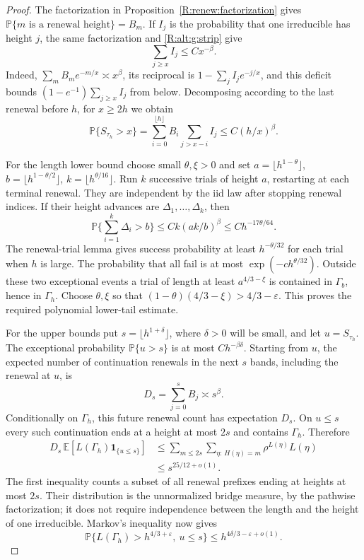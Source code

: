 \begin{proof}
The factorization in Proposition~\ref{R:renew:factorization} gives
$\mathbb P\{m\text{ is a renewal height}\}=B_m$. If $I_j$ is the
probability that one irreducible has height $j$, the same factorization
and \eqref{R:alt:g:strip} give
\[
 \sum_{j\ge x}I_j\le Cx^{-\beta}.
\]
Indeed, $\sum_m B_me^{-m/x}\asymp x^\beta$, its reciprocal is
$1-\sum_j I_je^{-j/x}$, and this deficit bounds
$(1-e^{-1})\sum_{j\ge x}I_j$ from below. Decomposing according to the
last renewal before $h$, for $x\ge2h$ we obtain
\begin{equation}\label{R:alt:g:overshoot}
 \mathbb P\{S_{\tau_h}>x\}
   =\sum_{i=0}^{\lfloor h\rfloor} B_i
                        \sum_{j>x-i}I_j
   \le C(h/x)^\beta.
\end{equation}

For the length lower bound choose small $\theta,\xi>0$ and set
$a=\lfloor h^{1-\theta}\rfloor$,
$b=\lfloor h^{1-\theta/2}\rfloor$,
$k=\lfloor h^{\theta/16}\rfloor$. Run $k$ successive trials of
height $a$, restarting at each terminal renewal. They are independent
by the iid law after stopping renewal indices. If their height advances
are $\Delta_1,\ldots,\Delta_k$, then
\[
 \mathbb P\Big\{\sum_{i=1}^k\Delta_i>b\Big\}
 \le Ck(ak/b)^\beta\le Ch^{-17\theta/64}.
\]
The renewal-trial lemma gives success probability at least
$h^{-\theta/32}$ for each trial when $h$ is large. The probability
that all fail is at most $\exp(-c h^{\theta/32})$. Outside these two
exceptional events a trial of length at least $a^{4/3-\xi}$ is contained
in $\Gamma_b$, hence in $\Gamma_h$. Choose $\theta,\xi$ so that
$(1-\theta)(4/3-\xi)>4/3-\varepsilon$. This proves the required
polynomial lower-tail estimate.

For the upper bounds put $s=\lfloor h^{1+\delta}\rfloor$, where
$\delta>0$ will be small, and let $u=S_{\tau_h}$. The exceptional
probability $\mathbb P\{u>s\}$ is at most $Ch^{-\beta\delta}$.
Starting from $u$, the expected number of continuation renewals in the
next $s$ bands, including the renewal at $u$, is
\[
 D_s=\sum_{j=0}^sB_j\asymp s^\beta.
\]
Conditionally on $\Gamma_h$, this future renewal count has expectation
$D_s$. On $u\le s$ every such continuation ends at a height at most
$2s$ and contains $\Gamma_h$. Therefore
\begin{align*}
 D_s\,\mathbb E[L(\Gamma_h)\mathbf1_{\{u\le s\}}]
 &\le\sum_{m\le2s}
       \sum_{\eta:\,H(\eta)=m}\rho^{L(\eta)}L(\eta)\\
 &\le s^{25/12+o(1)}.
\end{align*}
The first inequality counts a subset of all renewal prefixes ending at
heights at most $2s$. Their distribution is the unnormalized bridge
measure, by the pathwise factorization; it does not require independence
between the length and the height of one irreducible. Markov's inequality
now gives
\[
 \mathbb P\{L(\Gamma_h)>h^{4/3+\varepsilon},\ u\le s\}
 \le h^{4\delta/3-\varepsilon+o(1)}.
\]


\end{proof}
